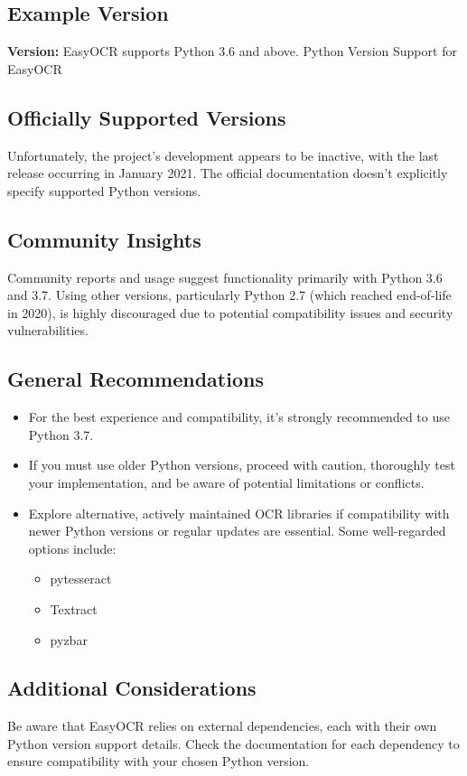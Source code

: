 \subsection{Example Version}
\textbf{Version:} EasyOCR supports Python 3.6 and above.\newline
Python Version Support for EasyOCR

\subsection*{Officially Supported Versions}
Unfortunately, the project's development appears to be inactive, with the last release occurring in January 2021. The official documentation doesn't explicitly specify supported Python versions.

\subsection*{Community Insights}
Community reports and usage suggest functionality primarily with Python 3.6 and 3.7. Using other versions, particularly Python 2.7 (which reached end-of-life in 2020), is highly discouraged due to potential compatibility issues and security vulnerabilities.

\subsection*{General Recommendations}
\begin{itemize}[label=--]
	\item For the best experience and compatibility, it's strongly recommended to use Python 3.7.
	\item If you must use older Python versions, proceed with caution, thoroughly test your implementation, and be aware of potential limitations or conflicts.
	\item Explore alternative, actively maintained OCR libraries if compatibility with newer Python versions or regular updates are essential. Some well-regarded options include:
	\begin{itemize}[label=$\bullet$]
		\item pytesseract
		\item Textract
		\item pyzbar
	\end{itemize}
\end{itemize}

\subsection*{Additional Considerations}
Be aware that EasyOCR relies on external dependencies, each with their own Python version support details. Check the documentation for each dependency to ensure compatibility with your chosen Python version.

